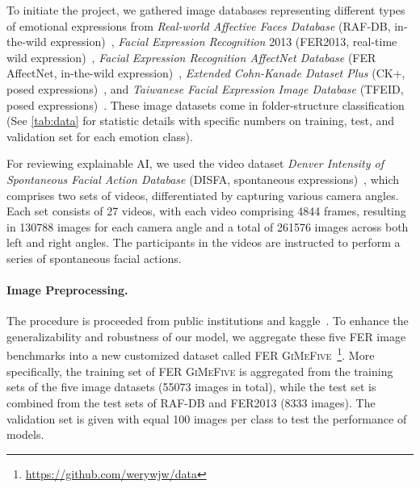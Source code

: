 To initiate the project, 
we gathered image databases representing different types of emotional expressions from 
\textit{Real-world Affective Faces Database} (RAF-DB, in-the-wild expression)~\cite{li_reliable_2017,li2019reliable}, 
\textit{Facial Expression Recognition} 2013 (FER2013, real-time wild expression)~\cite{BarsoumZCZ16}, 
\textit{Facial Expression Recognition AffectNet Database} (FER AffectNet, in-the-wild expression)~\cite{Mollah2019ANet}, 
\textit{Extended Cohn-Kanade Dataset Plus} (CK+, posed expressions)~\cite{LuceyCKSAM10}, 
and \textit{Taiwanese Facial Expression Image Database} (TFEID, posed expressions)~\cite{tfeid,LiGL22}.
These image datasets come in folder-structure classification (See \cref{tab:data} 
for statistic details with specific numbers on training, test, and validation set for each emotion class). 

For reviewing explainable AI, 
we used the video dataset \textit{Denver Intensity of Spontaneous Facial Action Database} 
(DISFA, spontaneous expressions)~\cite{MavadatiMBTC13}, 
which comprises two sets of videos, 
differentiated by capturing various camera angles. 
Each set consists of 27 videos, with each video comprising 4844 frames, 
resulting in 130788 images for each camera angle and a total of 261576 images across both left and right angles. 
The participants in the videos are instructed to perform a series of spontaneous facial actions. 

\paragraph{Image Preprocessing.}
The procedure is proceeded from public institutions and kaggle~\cite{kaggle_rafdb,kagaff}. 
To enhance the generalizability and robustness of our model, 
we aggregate these five FER image benchmarks into a new customized dataset called FER 
\textsc{GiMeFive}~\footnote{\url{https://github.com/werywjw/data}}. 
More specifically, 
the training set of FER \textsc{GiMeFive} is aggregated from the training sets of the five image datasets (55073 images in total), 
while the test set is combined from the test sets of RAF-DB and FER2013 (8333 images). 
The validation set is given with equal 100 images per class to test the performance of models. 

